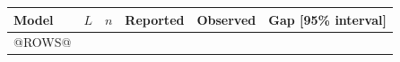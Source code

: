 \begin{tabular}{llrrrr}
\toprule
Model & $L$ & $n$ & Reported & Observed & Gap [95\% interval]\\
\midrule
@ROWS@
\bottomrule
\end{tabular}
